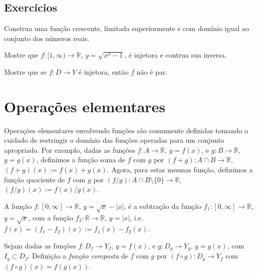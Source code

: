 \subsection*{Exercícios}

\construirExer

\begin{exer}
  Construa uma função crescente, limitada superiormente e com domínio igual ao conjunto dos números reais.
\end{exer}
\begin{resp}
  \construirResp
\end{resp}

\begin{exer}
  Mostre que $f:[1, \infty)\to \mathbb{R}$, $y = \sqrt{x^3 - 1}$, é injetora e contrua sua inversa.
\end{exer}
\begin{resp}
  \construirResp
\end{resp}

\begin{exer}
  Mostre que se $f:D\to Y$ é injetora, então $f$ não é par.
\end{exer}
\begin{resp}
  \construirResp
\end{resp}

\section{Operações elementares}

Operações elementares envolvendo funções são comumente definidas tomando o cuidado de restringir o domínio das funções operadas para um conjunto apropriado. Por exemplo, dadas as funções $f:A\to \mathbb{R}$, $y=f(x)$, e $g:B\to\mathbb{R}$, $y=g(x)$, definimos a função soma de $f$ com $g$ por $(f+g):A\cap B\to\mathbb{R}$, $(f+g)(x) := f(x) + g(x)$. Agora, para estas mesmas função, definimos a função quociente de $f$ com $g$ por $(f/g):A\cap B\setminus \{0\}\to\mathbb{R}$, $(f/g)(x) := f(x)/g(x)$.

\begin{ex}
  A função $f:[0, \infty]\to\mathbb{R}$, $y = \sqrt{x} - |x|$, é a subtração da função $f_1:[0, \infty]\to\mathbb{R}$, $y = \sqrt{x}$, com a função $f_2:\mathbb{R}\to\mathbb{R}$, $y = |x|$, i.e. $f(x) = (f_1-f_2)(x):= f_1(x) - f_2(x)$.
\end{ex}

\begin{defn}
  Sejam dadas as funções $f:D_f\to Y_f$, $y = f(x)$, e $g:D_g\to Y_g$, $y = g(x)$, com $I_g\subset D_f$. Definição a \emph{função composta} de $f$ com $g$ por $(f\circ g):D_g\to Y_f$ com $(f\circ g)(x) = f\left(g(x)\right)$.
\end{defn}

